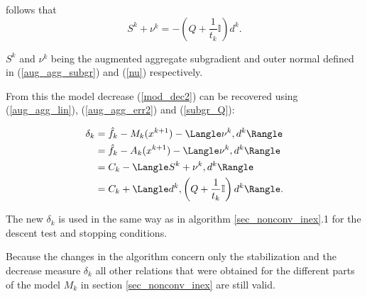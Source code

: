 follows that 
\begin{equation}
	S^k+\nu^k = -\left(Q+\frac{1}{t_k}\mathbb{I}\right)d^k.
	\label{subgr_Q}
\end{equation}

\(S^k\) and \(\nu^k\) being the augmented aggregate subgradient and outer normal defined in (\ref{aug_agg_subgr}) and (\ref{nu}) respectively.

From this the model decrease (\ref{mod_dec2}) can be recovered using (\ref{aug_agg_lin}), (\ref{aug_agg_err2}) and (\ref{subgr_Q}):

\begin{equation*}
\begin{split}
	\delta_k  &= \hat{f}_k - M_k(x^{k+1}) - \Langle\nu^k,d^k\Rangle\\
	&= \hat{f}_k - A_k(x^{k+1}) - \Langle\nu^k,d^k\Rangle\\
	&= C_k - \Langle S^k+\nu^k,d^k\Rangle \\
	&= C_k + \Langle d^k,\left(Q+\frac{1}{t_k}\mathbb{I}\right)d^k\Rangle.
	\label{Noll_delta}
\end{split}
\end{equation*}

The new \(\delta_k\) is used in the same way as in algorithm \ref{sec_nonconv_inex}.1 for the descent test and stopping conditions.

Because the changes in the algorithm concern only the stabilization and the decrease measure \(\delta_k\) all other relations that were obtained for the different parts of the model \(M_k\) in section \ref{sec_nonconv_inex} are still valid.









